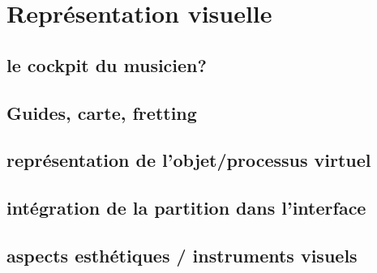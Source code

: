 %
\chapter{Représentation visuelle}
\label{ch:visual_representation}


\section{le cockpit du musicien?}
\label{sec:visual_representation:sec1}

\section{Guides, carte, fretting}

\section{représentation de l'objet/processus virtuel}

\section{intégration de la partition dans l'interface}

\section{aspects esthétiques / instruments visuels}
